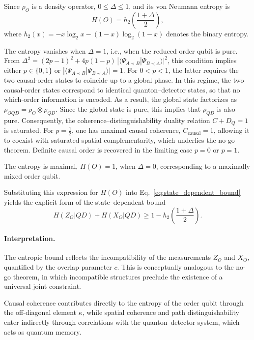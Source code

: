 \documentclass[aps,pra,reprint,superscriptaddress]{revtex4-2}
\begin{document}
Since $\rho_O$ is a density operator, $0 \le \Delta \le 1$, and its von Neumann entropy is
\begin{equation}
H(O) = h_2\!\left(\frac{1+\Delta}{2}\right),
\end{equation}
where $h_2(x) = -x\log_2 x - (1-x)\log_2(1-x)$ denotes the binary entropy.

The entropy vanishes when $\Delta=1$, i.e., when the reduced order qubit is pure. 
From $\Delta^2 = (2p-1)^2 + 4p(1-p)\,|\langle \Psi_{A\prec B} | \Psi_{B\prec A} \rangle|^2$, this condition implies either $p\in\{0,1\}$ or $|\langle \Psi_{A\prec B} | \Psi_{B\prec A} \rangle|=1$. For $0<p<1$, the latter requires the two causal-order states to coincide up to a global phase. In this regime, the two causal-order states correspond to identical quanton--detector states, so that no which-order information is encoded. As a result, the global state factorizes as $\rho_{OQD} = \rho_O \otimes \rho_{QD}$. Since the global state is pure, this implies that $\rho_{QD}$ is also pure. Consequently, the coherence--distinguishability duality relation $C + D_Q = 1$ is saturated. For $p=\tfrac{1}{2}$, one has maximal causal coherence, $C_{\mathrm{causal}}=1$, allowing it to coexist with saturated spatial complementarity, which underlies the no-go theorem. Definite causal order is recovered in the limiting case $p=0$ or $p=1$.

The entropy is maximal, $H(O)=1$, when $\Delta=0$, corresponding to a maximally mixed order qubit.

Substituting this expression for $H(O)$ into Eq.~\eqref{eq:state_dependent_bound} yields the explicit form of the state--dependent bound
\begin{equation}
H(Z_O|QD) + H(X_O|QD)
\ge
1 - h_2\!\left(\frac{1+\Delta}{2}\right).
\label{eq:explicit_state_bound}
\end{equation}

\medskip

\paragraph*{Interpretation.}

The entropic bound reflects the incompatibility of the measurements $Z_O$ and $X_O$, quantified by the overlap parameter $c$. This is conceptually analogous to the no-go theorem, in which incompatible structures preclude the existence of a universal joint constraint.

Causal coherence contributes directly to the entropy of the order qubit through the off-diagonal element $\kappa$, while spatial coherence and path distinguishability enter indirectly through correlations with the quanton--detector system, which acts as quantum memory.
\end{document}
